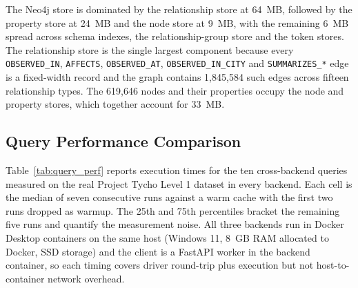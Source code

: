 \documentclass[12pt,a4paper]{article}
\begin{document}
The Neo4j store is dominated by the relationship store at 64~MB, followed by the property store at 24~MB and the node store at 9~MB, with the remaining 6~MB spread across schema indexes, the relationship-group store and the token stores. The relationship store is the single largest component because every \texttt{OBSERVED\_IN}, \texttt{AFFECTS}, \texttt{OBSERVED\_AT}, \texttt{OBSERVED\_IN\_CITY} and \texttt{SUMMARIZES\_*} edge is a fixed-width record and the graph contains 1{,}845{,}584 such edges across fifteen relationship types. The 619{,}646 nodes and their properties occupy the node and property stores, which together account for 33~MB.

\subsection{Query Performance Comparison}

Table~\ref{tab:query_perf} reports execution times for the ten cross-backend queries measured on the real Project Tycho Level 1 dataset in every backend. Each cell is the median of seven consecutive runs against a warm cache with the first two runs dropped as warmup. The 25th and 75th percentiles bracket the remaining five runs and quantify the measurement noise. All three backends run in Docker Desktop containers on the same host (Windows 11, 8~GB RAM allocated to Docker, SSD storage) and the client is a FastAPI worker in the backend container, so each timing covers driver round-trip plus execution but not host-to-container network overhead.
\end{document}
